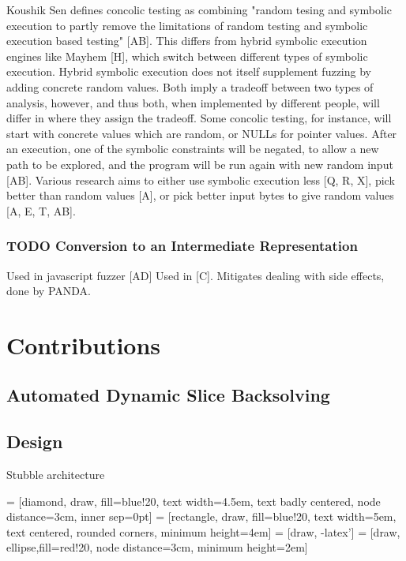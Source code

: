 \documentclass[11pt,expanded,copyright]{fsuthesis}
\begin{document}
Koushik Sen defines concolic testing as combining "random tesing and symbolic execution to partly remove the limitations of random testing and symbolic execution based testing" [AB]. This differs from hybrid symbolic execution engines like Mayhem [H], which switch between different types of symbolic execution. Hybrid symbolic execution does not itself supplement fuzzing by adding concrete random values. Both imply a tradeoff between two types of analysis, however, and thus both, when implemented by different people, will differ in where they assign the tradeoff. Some concolic testing, for instance, will start with concrete values which are random, or NULLs for pointer values. After an execution, one of the symbolic constraints will be negated, to allow a new path to be explored, and the program will be run again with new random input [AB]. Various research aims to either use symbolic execution less [Q, R, X], pick better than random values [A], or pick better input bytes to give random values [A, E, T, AB].

\subsection{TODO Conversion to an Intermediate Representation}

Used in javascript fuzzer [AD]
Used in [C].
Mitigates dealing with side effects, done by PANDA.

\chapter{Contributions}

\section{Automated Dynamic Slice Backsolving}

\section{Design}

Stubble architecture



 = [diamond, draw, fill=blue!20, 
    text width=4.5em, text badly centered, node distance=3cm, inner sep=0pt]
 = [rectangle, draw, fill=blue!20, 
    text width=5em, text centered, rounded corners, minimum height=4em]
 = [draw, -latex']
 = [draw, ellipse,fill=red!20, node distance=3cm,
    minimum height=2em]
    
\end{document}
